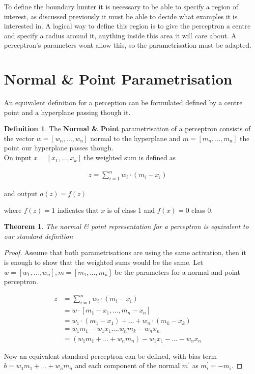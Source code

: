 \documentclass[notitlepage]{report}
\newtheorem{theorem}{Theorem}
\theoremstyle{definition}
\newtheorem{definition}{Definition}[section]
\begin{document}
To define the boundary hunter it is necessary to be able to specify a region of interest, as discussed previously it must be able to decide what examples it is interested in. A logical way to define this region is to give the perceptron a centre and specify a radius around it, anything inside this area it will care about. A perceptron's parameters wont allow this, so the parametrisation must be adapted.

\section{Normal \& Point Parametrisation}
An equivalent definition for a perception can be formulated defined by a centre point and a hyperplane passing though it.

\theoremstyle{definition}
\begin{definition}
	The \textbf{Normal \& Point} parametrisation of a perceptron consists of the vector $w = [w_n, ..., w_n]$ normal to the hyperplane and $m = [m_n, ..., m_n]$ the point our hyperplane passes though.\\
	
	On input $x = [x_1, ..., x_k]$ the weighted sum is defined as 
	
	\begin{align*}
	z = \sum_{i=1}^n w_i \cdot (m_i - x_i)
	\end{align*}
	
	and output $a(z) = f(z)$
	
	where $f(z) = 1$ indicates that $x$ is of class 1 and $f(x) = 0$ class 0.
\end{definition}

\begin{theorem}
The normal \& point representation for a perceptron is equivalent to our standard definition
\end{theorem}

\begin{proof}
Assume that both parametrisations are using the same activation, then it is enough to show that the weighted sums would be the same. Let $w = [w_1, ..., w_n], m = [m_1, ..., m_n]$ be the parameters for a normal and point perceptron.

\begin{align*}
z &= \sum_{i=1}^n w_i \cdot (m_i - x_i)\\
&= w \cdot [m_1 - x_1, ..., m_n - x_n]\\
&= w_1 \cdot (m_1 - x_1) + ... + w_n \cdot (m_k - x_k)\\
&= w_1m_1 - w_1x_1 .... w_nm_k - w_nx_n\\
&= (w_1m_1 + ... + w_nm_n) - w_1x_1 - ... - w_nx_n
\end{align*}

Now an equivalent standard perceptron can be defined, with bias term $b = w_1m_1 + ... + w_nm_n$ and each component of the normal $m^{'}$ as $m^{'}_i = -m_i$.
\end{proof}
\end{document}

